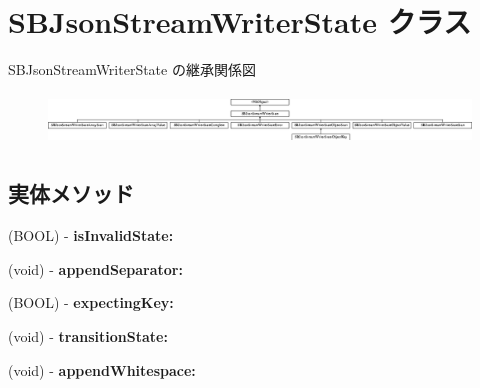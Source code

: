 \hypertarget{interface_s_b_json_stream_writer_state}{}\section{S\+B\+Json\+Stream\+Writer\+State クラス}
\label{interface_s_b_json_stream_writer_state}
S\+B\+Json\+Stream\+Writer\+State の継承関係図\begin{figure}[H]
\begin{center}
\leavevmode
\includegraphics[height=1.367521cm]{interface_s_b_json_stream_writer_state}
\end{center}
\end{figure}
\subsection*{実体メソッド}
\begin{DoxyCompactItemize}
\item 
\hypertarget{interface_s_b_json_stream_writer_state_a9deeb84ae5298289d6b225d155ff11bb}{}(B\+O\+O\+L) -\/ {\bfseries is\+Invalid\+State\+:}\label{interface_s_b_json_stream_writer_state_a9deeb84ae5298289d6b225d155ff11bb}

\item 
\hypertarget{interface_s_b_json_stream_writer_state_ae5aaa8df1e2d280025cdc87d89c82d58}{}(void) -\/ {\bfseries append\+Separator\+:}\label{interface_s_b_json_stream_writer_state_ae5aaa8df1e2d280025cdc87d89c82d58}

\item 
\hypertarget{interface_s_b_json_stream_writer_state_a5ac84b0148db05001847af19e18941c6}{}(B\+O\+O\+L) -\/ {\bfseries expecting\+Key\+:}\label{interface_s_b_json_stream_writer_state_a5ac84b0148db05001847af19e18941c6}

\item 
\hypertarget{interface_s_b_json_stream_writer_state_acd468b65c234da4c8359a77d7dcc83a8}{}(void) -\/ {\bfseries transition\+State\+:}\label{interface_s_b_json_stream_writer_state_acd468b65c234da4c8359a77d7dcc83a8}

\item 
\hypertarget{interface_s_b_json_stream_writer_state_a3b2712761a825156a1c6f80bc2744da8}{}(void) -\/ {\bfseries append\+Whitespace\+:}\label{interface_s_b_json_stream_writer_state_a3b2712761a825156a1c6f80bc2744da8}

\end{DoxyCompactItemize}
